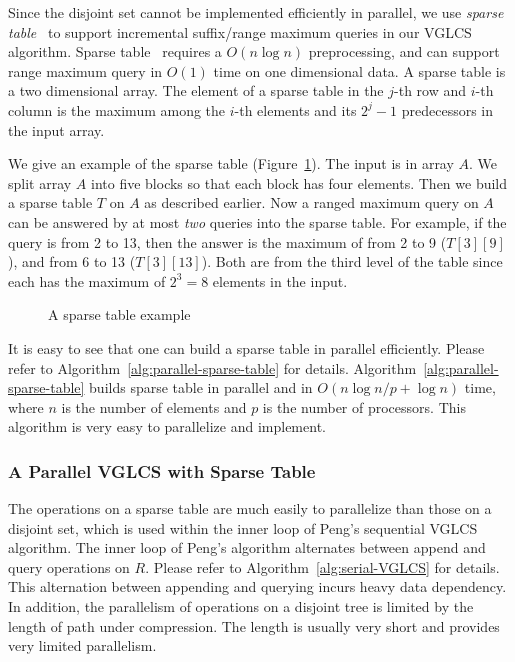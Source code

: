 Since the disjoint set cannot be implemented efficiently in parallel,
we use {\em sparse table}~\cite{Berkman1993RecursiveSP} to support
incremental suffix/range maximum queries in our VGLCS algorithm.
Sparse table~\cite{Berkman1993RecursiveSP} requires a $O(n \log n)$
preprocessing, and can support range maximum query in $O(1)$ time on
one dimensional data.  A sparse table is a two dimensional array.  The
element of a sparse table in the $j$-th row and $i$-th column is the
maximum among the $i$-th elements and its $2^j - 1$ predecessors in
the input array.

We give an example of the sparse table
(Figure~\ref{fig:interval-decomposition}).  The input is in array $A$.
We split array $A$ into five blocks so that each block has four
elements.  Then we build a sparse table $T$ on $A$ as described
earlier.  Now a ranged maximum query on $A$ can be answered by at most
{\em two} queries into the sparse table.  For example, if the query is
from 2 to 13, then the answer is the maximum of from 2 to 9
($T[3][9]$), and from 6 to 13 ($T[3][13]$).  Both are from the third
level of the table since each has the maximum of $2^3 = 8$ elements in
the input.

\begin{figure}[!thb]
  \centering {} 
  \caption{A sparse table example}
  \label{fig:interval-decomposition}
\end{figure}

It is easy to see that one can build a sparse table in parallel
efficiently.  Please refer to
Algorithm~\ref{alg:parallel-sparse-table} for details.
Algorithm~\ref{alg:parallel-sparse-table} builds sparse table in
parallel and in $O(n \log n / p + \log n)$ time, where $n$ is the
number of elements and $p$ is the number of processors.  This
algorithm is very easy to parallelize and implement.



\subsubsection{A Parallel VGLCS with Sparse Table}

The operations on a sparse table are much easily to parallelize than
those on a disjoint set, which is used within the inner loop of Peng's
sequential VGLCS algorithm.  The inner loop of Peng's algorithm
alternates between append and query operations on $R$.  Please refer
to Algorithm~\ref{alg:serial-VGLCS} for details.  This alternation
between appending and querying incurs heavy data dependency.  In
addition, the parallelism of operations on a disjoint tree is limited
by the length of path under compression.  The length is usually very
short and provides very limited parallelism.

